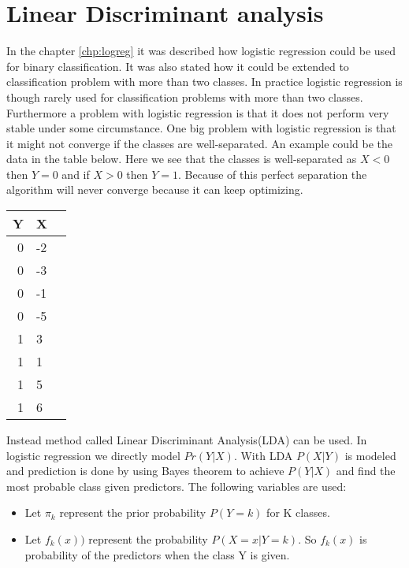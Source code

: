 \chapter{Linear Discriminant analysis}
\label{chp:lindisana}

In the chapter \ref{chp:logreg} it was described how logistic regression could be used for binary classification. It was also stated how it could be extended to  classification problem with more than two classes. In practice logistic regression is though rarely used for classification problems with more than two classes. Furthermore a problem with logistic regression is that it does not perform very stable under some circumstance. One big problem with logistic regression is that it might not converge if the classes are well-separated. An example could be the data in the table below. Here we see that the classes is well-separated as $X<0$ then $Y=0$ and if $X>0$ then $Y=1$. Because of this perfect separation the algorithm will never converge because it can keep optimizing.
\begin{center} 
	\begin{tabular}{rll}
		\multicolumn{1}{c}{\textbf{Y}} &
		\multicolumn{1}{c}{\textbf{X}} \\ \hline
		0     &  -2  \\[0.05cm] 
		0     &  -3  \\[0.05cm] 
		0     &  -1  \\[0.05cm] 
		0     &  -5  \\[0.05cm] 
		1     &    3  \\[0.05cm] 
		1     &    1  \\[0.05cm] 
		1     &    5  \\[0.05cm] 
		1     &    6  \\[0.05cm] 
	\end{tabular}
\end{center}

Instead method called Linear Discriminant Analysis(LDA) can be used. In logistic regression we directly model $Pr(Y|X)$. With LDA $P(X|Y)$ is modeled and prediction is done by using Bayes theorem to achieve $P(Y|X)$ and find the most probable class given predictors. The following variables are used:

\begin{itemize}
	\item Let $\pi_k$ represent the prior probability $P(Y=k)$ for K classes.
	\item Let $f_k(x))$ represent the probability $P(X=x|Y=k)$. So $f_k(x)$ is probability of the predictors when the class Y is given.
\end{itemize} 

